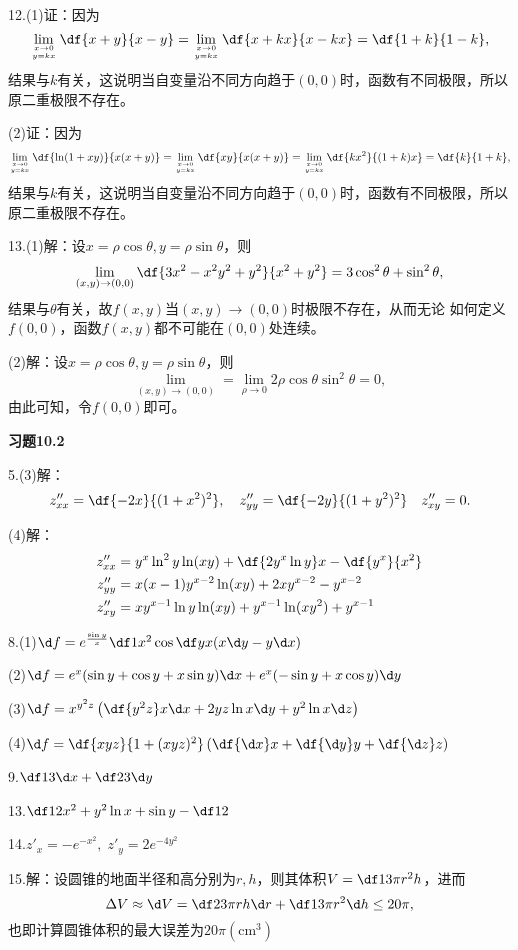 12.(1)\;证：因为
$$
	\lim\limits_{x\to 0\atop{y=kx}}\df{x+y}{x-y}
	=\lim\limits_{x\to 0\atop{y=kx}}\df{x+kx}{x-kx}=\df{1+k}{1-k},
$$
结果与$k$有关，这说明当自变量沿不同方向趋于$(0,0)$时，函数有不同极限，所以
原二重极限不存在。

(2)\;证：因为
$$
	\lim\limits_{x\to 0\atop{y=kx}}\df{\ln(1+xy)}{x(x+y)}
	=\lim\limits_{x\to 0\atop{y=kx}}\df{xy}{x(x+y)}
	=\lim\limits_{x\to 0\atop{y=kx}}\df{kx^2}{(1+k)x}=\df{k}{1+k},
$$
结果与$k$有关，这说明当自变量沿不同方向趋于$(0,0)$时，函数有不同极限，所以
原二重极限不存在。

13.(1)\;解：设$x=\rho\cos\theta,y=\rho\sin\theta$，则
$$
	\lim\limits_{(x,y)\to(0,0)}\df{3x^2-x^2y^2+y^2}{x^2+y^2}
	=3\cos^2\theta+\sin^2\theta,
$$
结果与$\theta$有关，故$f(x,y)$当$(x,y)\to(0,0)$时极限不存在，从而无论
如何定义$f(0,0)$，函数$f(x,y)$都不可能在$(0,0)$处连续。

(2)\;解：设$x=\rho\cos\theta,y=\rho\sin\theta$，则
$$
	\lim\limits_{(x,y)\to(0,0)}=\lim\limits_{\rho\to0}
	2\rho\cos\theta\sin^2\theta=0,
$$
由此可知，令$f(0,0)$即可。

{\bf 习题10.2}

5.(3)\;解：
$$z''_{xx}=\df{-2x}{(1+x^2)^2},\quad
z''_{yy}=\df{-2y}{(1+y^2)^2}\quad
z''_{xy}=0.$$

(4)\;解：
\begin{align*}
	z''_{xx}&=y^x\ln^2y\ln(xy)+\df{2y^x\ln y}x-\df{y^x}{x^2}\\
	z''_{yy}&=x(x-1)y^{x-2}\ln(xy)+2xy^{x-2}-y^{x-2}\\
	z''_{xy}&=xy^{x-1}\ln y\ln(xy)+y^{x-1}\ln(xy^2)+y^{x-1}
\end{align*}

8.\;(1)$\d f=e^{\frac{\sin y}x}\df1{x^2}\cos\df yx(x\d y-y\d x)$

(2)$\d f=e^x(\sin y+\cos y+x\sin y)\d x+e^x(-\sin y+x\cos y)\d y$

(3)$\d f=x^{y^2z}\left(\df{y^2z}x\d x+2yz\ln x\d y+y^2\ln x\d z\right)$

(4)$\d f=\df{xyz}{1+(xyz)^2}\left(\df{\d x}x+\df{\d y}y+\df{\d z}z\right)$

9.\;$\df13\d x+\df23\d y$

13.\;$\df12x^2+y^2\ln x+\sin y-\df12$

14.\;$z'_x=-e^{-x^2},\;z'_y=2e^{-4y^2}$

15.\;解：设圆锥的地面半径和高分别为$r,h$，则其体积$V=\df13\pi r^2h$，进而
$$\Delta V\approx\d V=\df23\pi rh\d r+\df13\pi r^2\d h\leq 20\pi,$$
也即计算圆锥体积的最大误差为$20\pi(\mathrm{cm}^3)$

